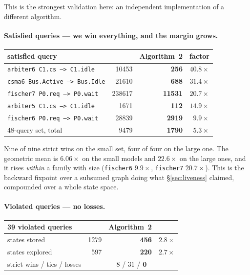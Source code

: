 This is the strongest validation here: an independent implementation of a different algorithm.

\paragraph{Satisfied queries --- we win everything, and the margin grows.}

\begin{center}
\begin{tabular}{@{}lrrr@{}}
\toprule
satisfied query & \verifyta{} & Algorithm~2 & factor \\
\midrule
\texttt{arbiter6 C1.cs --> C1.idle}    & 10453  & \textbf{256}   & $40.8\times$ \\
\texttt{csma6 Bus.Active --> Bus.Idle} & 21610  & \textbf{688}   & $31.4\times$ \\
\texttt{fischer7 P0.req --> P0.wait}   & 238617 & \textbf{11531} & $20.7\times$ \\
\texttt{arbiter5 C1.cs --> C1.idle}    & 1671   & \textbf{112}   & $14.9\times$ \\
\texttt{fischer6 P0.req --> P0.wait}   & 28839  & \textbf{2919}  & $9.9\times$ \\
\midrule
48-query set, total                     & 9479   & \textbf{1790}  & $5.3\times$ \\
\bottomrule
\end{tabular}
\end{center}

Nine of nine strict wins on the small set, four of four on the large one. The geometric mean is
$6.06\times$ on the small models and $22.6\times$ on the large ones, and it rises \emph{within} a
family with size (\texttt{fischer6} $9.9\times$, \texttt{fischer7} $20.7\times$). This is the
backward fixpoint over a subsumed graph doing what \S\ref{sec:liveness} claimed, compounded over a
whole state space. \measured{}

\paragraph{Violated queries --- no losses.}

\begin{center}
\begin{tabular}{@{}lrrr@{}}
\toprule
39 violated queries & \verifyta{} & Algorithm~2 & \\
\midrule
states stored   & 1279 & \textbf{456} & $2.8\times$ \\
states explored & 597  & \textbf{220} & $2.7\times$ \\
strict wins / ties / losses & \multicolumn{3}{c}{$8$ / $31$ / $\mathbf{0}$} \\
\bottomrule
\end{tabular}
\end{center}

